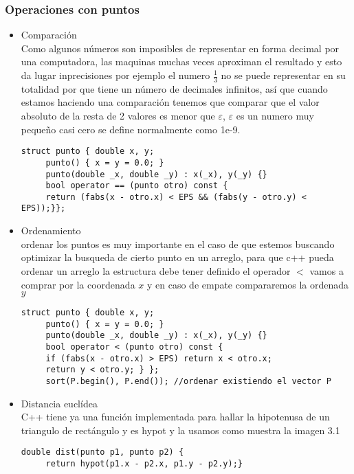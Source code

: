 \subsubsection{Operaciones con puntos}
\begin{itemize}
	\item Comparación
	 \\
	 Como algunos números son imposibles de representar en forma decimal por una computadora, las maquinas muchas veces aproximan el
	 resultado y esto da lugar inprecisiones  por ejemplo el numero $\frac{1}{3}$ no se puede representar en su totalidad por que tiene un número
	 de decimales infinitos, así que cuando estamos haciendo una comparación tenemos que comparar que  el valor absoluto de la resta de
	 2 valores es menor que $\varepsilon$, $\varepsilon$ es un numero muy pequeño casi cero se define normalmente como  1e-9.
	 \\
	 \begin{lstlisting}[style=C]
	 struct punto { double x, y;
	 punto() { x = y = 0.0; }
	 punto(double _x, double _y) : x(_x), y(_y) {}
	 bool operator == (punto otro) const {
	 return (fabs(x - otro.x) < EPS && (fabs(y - otro.y) < EPS));}};
	 \end{lstlisting}
	 \item Ordenamiento
	 \\
	 ordenar los puntos es muy importante en el caso de que estemos buscando optimizar la busqueda de cierto punto en un arreglo, para
	 que c++ pueda ordenar un arreglo la estructura debe tener definido el operador $<$ vamos a comprar por la coordenada $x$ y en caso
	 de empate compararemos la ordenada $y$
	 \begin{lstlisting}[style=C]
	 struct punto { double x, y;
	 punto() { x = y = 0.0; }
	 punto(double _x, double _y) : x(_x), y(_y) {}
	 bool operator < (punto otro) const {
	 if (fabs(x - otro.x) > EPS) return x < otro.x;
	 return y < otro.y; } };
	 sort(P.begin(), P.end()); //ordenar existiendo el vector P
	 \end{lstlisting}
	 \item Distancia euclídea
	 \\
	 C++ tiene ya una función implementada para hallar la hipotenusa de un triangulo de rectángulo y es hypot y la usamos como muestra la imagen 3.1
	 \\
	 \begin{lstlisting}[style=C]
	 double dist(punto p1, punto p2) {
	 return hypot(p1.x - p2.x, p1.y - p2.y);}
	 \end{lstlisting}
\end{itemize}
